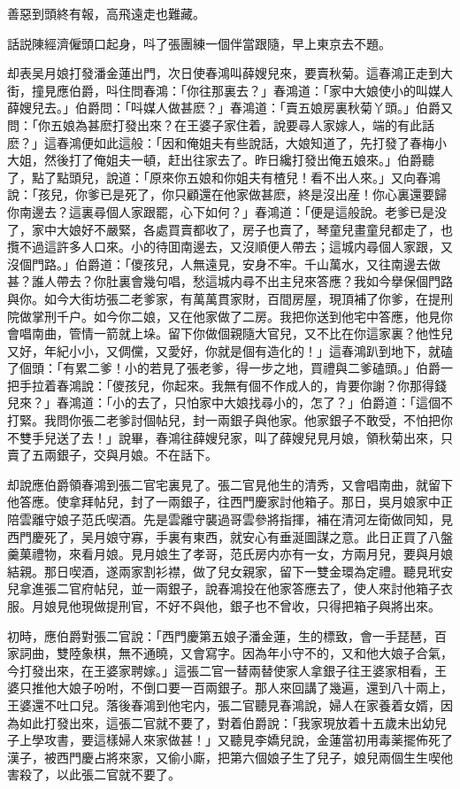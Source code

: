 善惡到頭終有報，高飛遠走也難藏。

話説陳經濟僱頭口起身，呌了張團練一個伴當跟隨，早上東京去不題。

却表吴月娘打發潘金蓮出門，次日使春鴻叫薛嫂兒來，要賣秋菊。這春鴻正走到大街，撞見應伯爵，呌住問春鴻：「你往那裏去？」春鴻道：「家中大娘使小的叫媒人薛嫂兒去。」伯爵問：「呌媒人做甚麽？」春鴻道：「賣五娘房裏秋菊丫頭。」伯爵又問：「你五娘為甚麽打發出來？在王婆子家住着，說要尋人家嫁人，端的有此話麽？」這春鴻便如此這般：「因和俺姐夫有些說話，大娘知道了，先打發了春梅小大姐，然後打了俺姐夫一頓，赶出往家去了。昨日纔打發出俺五娘來。」伯爵聽了，點了點頭兒，說道：「原來你五娘和你姐夫有楂兒！看不出人來。」又向春鴻說：「孩兒，你爹已是死了，你只顧還在他家做甚麽，終是沒出産！你心裏還要歸你南邊去？這裏尋個人家跟罷，心下如何？」春鴻道：「便是這般說。老爹已是没了，家中大娘好不嚴緊，各處買賣都收了，房子也賣了，琴童兒畫童兒都走了，也攬不過這許多人口來。小的待囬南邊去，又沒順便人帶去；這城内尋個人家跟，又沒個門路。」伯爵道：「儍孩兒，人無遠見，安身不牢。千山萬水，又往南邊去做甚？誰人帶去？你肚裏會幾句唱，愁這城内尋不出主兒來答應？我如今擧保個門路與你。如今大街坊張二老爹家，有萬萬貫家財，百間房屋，現頂補了你爹，在提刑院做掌刑千户。如今你二娘，又在他家做了二房。我把你送到他宅中答應，他見你會唱南曲，管情一箭就上垛。留下你做個親隨大官兒，又不比在你這家裏？他性兒又好，年紀小小，又倜儻，又愛好，你就是個有造化的！」這春鴻趴到地下，就磕了個頭：「有累二爹！小的若見了張老爹，得一步之地，買禮與二爹磕頭。」伯爵一把手拉着春鴻說：「儍孩兒，你起來。我無有個不作成人的，肯要你謝？你那得錢兒來？」春鴻道：「小的去了，只怕家中大娘找尋小的，怎了？」伯爵道：「這個不打緊。我問你張二老爹討個帖兒，封一兩銀子與他家。他家銀子不敢受，不怕把你不雙手兒送了去！」說畢，春鴻往薛嫂兒家，叫了薛嫂兒見月娘，領秋菊出來，只賣了五兩銀子，交與月娘。不在話下。

却說應伯爵領春鴻到張二官宅裏見了。張二官見他生的清秀，又會唱南曲，就留下他答應。使拿拜帖兒，封了一兩銀子，往西門慶家討他箱子。那日，吳月娘家中正陪雲離守娘子范氏喫酒。先是雲離守襲過哥雲參將指揮，補在清河左衛做同知，見西門慶死了，吴月娘守寡，手裏有東西，就安心有垂涎圖謀之意。此日正買了八盤羹菓禮物，來看月娘。見月娘生了孝哥，范氏房内亦有一女，方兩月兒，要與月娘結親。那日喫酒，遂兩家割衫襟，做了兒女親家，留下一雙金環為定禮。聽見玳安兒拿進張二官府帖兒，並一兩銀子，說春鴻投在他家答應去了，使人來討他箱子衣服。月娘見他現做提刑官，不好不與他，銀子也不曾收，只得把箱子與將出來。

初時，應伯爵對張二官說：「西門慶第五娘子潘金蓮，生的標致，會一手琵琶，百家詞曲，雙陸象棋，無不通曉，又會寫字。因為年小守不的，又和他大娘子合氣，今打發出來，在王婆家聘嫁。」這張二官一替兩替使家人拿銀子往王婆家相看，王婆只推他大娘子吩咐，不倒口要一百兩銀子。那人來回講了幾遍，還到八十兩上，王婆還不吐口兒。落後春鴻到他宅内，張二官聽見春鴻說，婦人在家養着女婿，因為如此打發出來，這張二官就不要了，對着伯爵說：「我家現放着十五歲未出幼兒子上學攻書，要這樣婦人來家做甚！」又聽見李嬌兒說，金蓮當初用毒薬擺佈死了漢子，被西門慶占將來家，又偷小廝，把第六個娘子生了兒子，娘兒兩個生生喫他害殺了，以此張二官就不要了。

